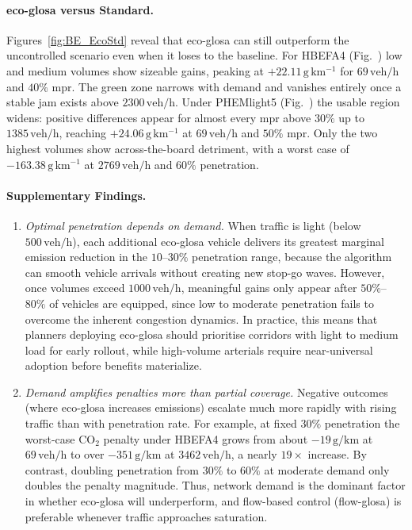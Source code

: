 \paragraph{\ac{eco-glosa} versus Standard.}
Figures~\ref{fig:BE_EcoStd} reveal that \ac{eco-glosa} can still outperform the uncontrolled scenario even when it loses to the baseline. For HBEFA4 (Fig.~) low and medium volumes show sizeable gains, peaking at $+22.11\,\mathrm{g\,km^{-1}}$ for $69\,\mathrm{veh/h}$ and $40\%$ \ac{mpr}. The green zone narrows with demand and vanishes entirely once a stable jam exists above $2300\,\mathrm{veh/h}$. Under PHEMlight5 (Fig.~) the usable region widens: positive differences appear for almost every \ac{mpr} above $30\%$ up to $1385\,\mathrm{veh/h}$, reaching $+24.06\,\mathrm{g\,km^{-1}}$ at $69\,\mathrm{veh/h}$ and $50\%$ \ac{mpr}. Only the two highest volumes show across-the-board detriment, with a worst case of $-163.38\,\mathrm{g\,km^{-1}}$ at $2769\,\mathrm{veh/h}$ and $60\%$ penetration.

\paragraph{Supplementary Findings.}
\begin{enumerate}
  \item \textit{Optimal penetration depends on demand.}  When traffic is light (below $500\,\mathrm{veh/h}$), each additional \ac{eco-glosa} vehicle delivers its greatest marginal emission reduction in the $10$–$30\%$ penetration range, because the algorithm can smooth vehicle arrivals without creating new stop-go waves. However, once volumes exceed $1000\,\mathrm{veh/h}$, meaningful gains only appear after $50\%$–$80\%$ of vehicles are equipped, since low to moderate penetration fails to overcome the inherent congestion dynamics. In practice, this means that planners deploying \ac{eco-glosa} should prioritise corridors with light to medium load for early rollout, while high-volume arterials require near-universal adoption before benefits materialize.
  \item \textit{Demand amplifies penalties more than partial coverage.}  Negative outcomes (where \ac{eco-glosa} increases emissions) escalate much more rapidly with rising traffic than with penetration rate. For example, at fixed $30\%$ penetration the worst-case CO$_2$ penalty under HBEFA4 grows from about $-19\,\mathrm{g/km}$ at $69\,\mathrm{veh/h}$ to over $-351\,\mathrm{g/km}$ at $3462\,\mathrm{veh/h}$, a nearly $19\times$ increase. By contrast, doubling penetration from $30\%$ to $60\%$ at moderate demand only doubles the penalty magnitude. Thus, network demand is the dominant factor in whether \ac{eco-glosa} will underperform, and flow-based control (\ac{flow-glosa}) is preferable whenever traffic approaches saturation.
\end{enumerate}


